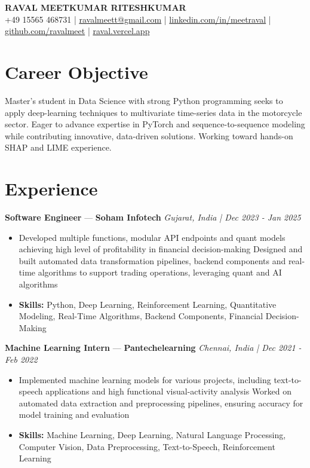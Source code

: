 \documentclass[a4paper,10pt]{article}
\begin{document}
\begin{center}
  {\Large\bfseries RAVAL MEETKUMAR RITESHKUMAR}\\[2pt]
  {\small +49 15565 468731 \;|\; \href{mailto:ravalmeett@gmail.com}{ravalmeett@gmail.com} \;|\; \href{https://www.linkedin.com/in/meetraval/}{linkedin.com/in/meetraval} \;|\; \href{https://github.com/ravalmeet}{github.com/ravalmeet} \;|\; \href{https://raval.vercel.app/}{raval.vercel.app}}
\end{center}
\vspace{-3pt}

\section*{Career Objective}
Master's student in Data Science with strong Python programming seeks to apply deep-learning techniques to multivariate time-series data in the motorcycle sector. Eager to advance expertise in PyTorch and sequence-to-sequence modeling while contributing innovative, data-driven solutions. Working toward hands-on SHAP and LIME experience.\par

\section*{Experience}
\textbf{Software Engineer} — \textbf{Soham Infotech} \hfill \textit{Gujarat, India \;|\; Dec 2023 - Jan 2025}\par
\vspace{1pt}
\begin{itemize}
  \item Developed multiple functions, modular API endpoints and quant models achieving high level of profitability in financial decision-making Designed and built automated data transformation pipelines, backend components and real-time algorithms to support trading operations, leveraging quant and AI algorithms
  \item \textbf{Skills:} Python, Deep Learning, Reinforcement Learning, Quantitative Modeling, Real-Time Algorithms, Backend Components, Financial Decision-Making
\end{itemize}
\vspace{3pt}
\textbf{Machine Learning Intern} — \textbf{Pantechelearning} \hfill \textit{Chennai, India \;|\; Dec 2021 - Feb 2022}\par
\vspace{1pt}
\begin{itemize}
  \item Implemented machine learning models for various projects, including text-to-speech applications and high functional visual-activity analysis Worked on automated data extraction and preprocessing pipelines, ensuring accuracy for model training and evaluation
  \item \textbf{Skills:} Machine Learning, Deep Learning, Natural Language Processing, Computer Vision, Data Preprocessing, Text-to-Speech, Reinforcement Learning
\end{itemize}
\end{document}
